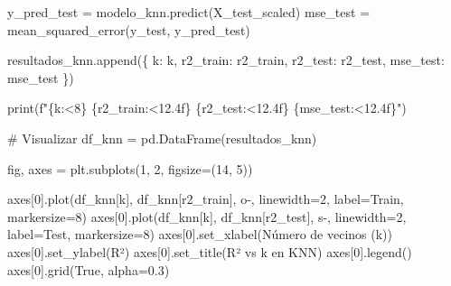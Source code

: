 \documentclass[
  doc,
  floatsintext,
  longtable,
  a4paper,
  nolmodern,
  notxfonts,
  notimes,
  12pt,
  colorlinks=true,linkcolor=blue,citecolor=blue,urlcolor=blue]{apa7}
\newenvironment{Shaded}{\begin{snugshade}}{\end{snugshade}}
\newcommand{\BuiltInTok}[1]{\textcolor[rgb]{0.00,0.23,0.31}{#1}}
\newcommand{\CommentTok}[1]{\textcolor[rgb]{0.37,0.37,0.37}{#1}}
\newcommand{\DecValTok}[1]{\textcolor[rgb]{0.68,0.00,0.00}{#1}}
\newcommand{\FloatTok}[1]{\textcolor[rgb]{0.68,0.00,0.00}{#1}}
\newcommand{\NormalTok}[1]{\textcolor[rgb]{0.00,0.23,0.31}{#1}}
\newcommand{\OperatorTok}[1]{\textcolor[rgb]{0.37,0.37,0.37}{#1}}
\newcommand{\SpecialCharTok}[1]{\textcolor[rgb]{0.37,0.37,0.37}{#1}}
\newcommand{\SpecialStringTok}[1]{\textcolor[rgb]{0.13,0.47,0.30}{#1}}
\newcommand{\StringTok}[1]{\textcolor[rgb]{0.13,0.47,0.30}{#1}}
\newcommand{\VariableTok}[1]{\textcolor[rgb]{0.07,0.07,0.07}{#1}}
\begin{document}
\begin{Shaded}
\begin{Highlighting}[]
\NormalTok{    y\_pred\_test }\OperatorTok{=}\NormalTok{ modelo\_knn.predict(X\_test\_scaled)}
\NormalTok{    mse\_test }\OperatorTok{=}\NormalTok{ mean\_squared\_error(y\_test, y\_pred\_test)}
    
\NormalTok{    resultados\_knn.append(\{}
        \StringTok{\textquotesingle{}k\textquotesingle{}}\NormalTok{: k,}
        \StringTok{\textquotesingle{}r2\_train\textquotesingle{}}\NormalTok{: r2\_train,}
        \StringTok{\textquotesingle{}r2\_test\textquotesingle{}}\NormalTok{: r2\_test,}
        \StringTok{\textquotesingle{}mse\_test\textquotesingle{}}\NormalTok{: mse\_test}
\NormalTok{    \})}
    
    \BuiltInTok{print}\NormalTok{(}\SpecialStringTok{f"}\SpecialCharTok{\{}\NormalTok{k}\SpecialCharTok{:\textless{}8\}}\SpecialStringTok{ }\SpecialCharTok{\{}\NormalTok{r2\_train}\SpecialCharTok{:\textless{}12.4f\}}\SpecialStringTok{ }\SpecialCharTok{\{}\NormalTok{r2\_test}\SpecialCharTok{:\textless{}12.4f\}}\SpecialStringTok{ }\SpecialCharTok{\{}\NormalTok{mse\_test}\SpecialCharTok{:\textless{}12.4f\}}\SpecialStringTok{"}\NormalTok{)}

\CommentTok{\# Visualizar}
\NormalTok{df\_knn }\OperatorTok{=}\NormalTok{ pd.DataFrame(resultados\_knn)}

\NormalTok{fig, axes }\OperatorTok{=}\NormalTok{ plt.subplots(}\DecValTok{1}\NormalTok{, }\DecValTok{2}\NormalTok{, figsize}\OperatorTok{=}\NormalTok{(}\DecValTok{14}\NormalTok{, }\DecValTok{5}\NormalTok{))}

\NormalTok{axes[}\DecValTok{0}\NormalTok{].plot(df\_knn[}\StringTok{\textquotesingle{}k\textquotesingle{}}\NormalTok{], df\_knn[}\StringTok{\textquotesingle{}r2\_train\textquotesingle{}}\NormalTok{], }
             \StringTok{\textquotesingle{}o{-}\textquotesingle{}}\NormalTok{, linewidth}\OperatorTok{=}\DecValTok{2}\NormalTok{, label}\OperatorTok{=}\StringTok{\textquotesingle{}Train\textquotesingle{}}\NormalTok{, markersize}\OperatorTok{=}\DecValTok{8}\NormalTok{)}
\NormalTok{axes[}\DecValTok{0}\NormalTok{].plot(df\_knn[}\StringTok{\textquotesingle{}k\textquotesingle{}}\NormalTok{], df\_knn[}\StringTok{\textquotesingle{}r2\_test\textquotesingle{}}\NormalTok{], }
             \StringTok{\textquotesingle{}s{-}\textquotesingle{}}\NormalTok{, linewidth}\OperatorTok{=}\DecValTok{2}\NormalTok{, label}\OperatorTok{=}\StringTok{\textquotesingle{}Test\textquotesingle{}}\NormalTok{, markersize}\OperatorTok{=}\DecValTok{8}\NormalTok{)}
\NormalTok{axes[}\DecValTok{0}\NormalTok{].set\_xlabel(}\StringTok{\textquotesingle{}Número de vecinos (k)\textquotesingle{}}\NormalTok{)}
\NormalTok{axes[}\DecValTok{0}\NormalTok{].set\_ylabel(}\StringTok{\textquotesingle{}R²\textquotesingle{}}\NormalTok{)}
\NormalTok{axes[}\DecValTok{0}\NormalTok{].set\_title(}\StringTok{\textquotesingle{}R² vs k en KNN\textquotesingle{}}\NormalTok{)}
\NormalTok{axes[}\DecValTok{0}\NormalTok{].legend()}
\NormalTok{axes[}\DecValTok{0}\NormalTok{].grid(}\VariableTok{True}\NormalTok{, alpha}\OperatorTok{=}\FloatTok{0.3}\NormalTok{)}


\end{Highlighting}
\end{Shaded}
\end{document}
